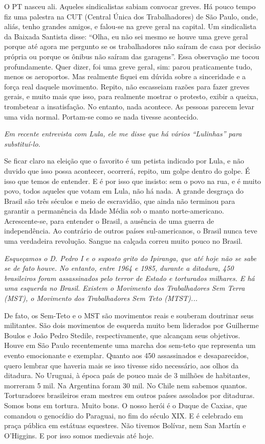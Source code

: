 \normalfont 
O PT nasceu ali. Aqueles sindicalistas sabiam convocar
greves. Há pouco tempo fiz uma palestra na CUT (Central Única dos
Trabalhadores) de São Paulo, onde, aliás, tenho grandes amigos, e
falou-se na greve geral na capital. Um sindicalista da Baixada Santista
disse: ``Olha, eu não sei mesmo se houve uma greve geral porque até
agora me pergunto se os trabalhadores não saíram de casa por decisão
própria ou porque os ônibus não saíram das garagens''. Essa observação
me tocou profundamente. Quer dizer, foi uma greve geral, sim: parou
praticamente tudo, menos os aeroportos. Mas realmente fiquei em dúvida
sobre a sinceridade e a força real daquele movimento. Repito, não
escasseiam razões para fazer greves gerais, e muito mais que isso, para
realmente mostrar o protesto, exibir a queixa, trombetear a
insatisfação. No entanto, nada acontece. As pessoas parecem levar uma
vida normal. Portam-se como se nada tivesse acontecido.

\itshape
Em recente entrevista com Lula, ele me disse que há
vários ``Lulinhas'' para substituí-lo.

\normalfont 
Se ficar claro na eleição que o favorito é um petista
indicado por Lula, e não duvido que isso possa acontecer, ocorrerá,
repito, um golpe dentro do golpe. É isso que temos de entender. E é por
isso que insisto: sem o povo na rua, e é muito povo, todos aqueles que
votam em Lula, não há nada. A grande desgraça do Brasil são três séculos
e meio de escravidão, que ainda não terminou para garantir a permanência
da Idade Média sob o manto norte-americano. Acrescente-se, para entender
o Brasil, a ausência de uma guerra de independência. Ao contrário de
outros países sul-americanos, o Brasil nunca teve uma verdadeira
revolução. Sangue na calçada correu muito pouco no Brasil.

\itshape
Esqueçamos o D. Pedro I e o suposto grito do Ipiranga,
que até hoje não se sabe se de fato houve. No entanto, entre 1964 e
1985, durante a ditadura, 450 brasileiros foram assassinados pelo terror
de Estado e torturados milhares. E há uma esquerda no Brasil. Existem o
Movimento dos Trabalhadores Sem Terra (MST), o Movimento dos
Trabalhadores Sem Teto (MTST)...

\normalfont 
De fato, os Sem-Teto e o MST são movimentos reais e
souberam doutrinar seus militantes. São dois movimentos de esquerda
muito bem liderados por Guilherme Boulos e João Pedro Stedile,
respectivamente, que alcançam seus objetivos. Houve em São Paulo
recentemente uma marcha dos sem-teto que representa um evento
emocionante e exemplar. Quanto aos 450 assassinados e desaparecidos,
quero lembrar que haveria mais se isso tivesse sido necessário, aos
olhos da ditadura. No Uruguai, à época país de pouco mais de 3 milhões
de habitantes, morreram 5 mil. Na Argentina foram 30 mil. No Chile nem
sabemos quantos. Torturadores brasileiros eram mestres em outros países
assolados por ditaduras. Somos bons em tortura. Muito bons. O nosso
herói é o Duque de Caxias, que comandou o genocídio do Paraguai, no fim
do século XIX. E é celebrado em praça pública em estátuas equestres. Não
tivemos Bolívar, nem San Martín e O'Higgins. E por isso somos medievais
até hoje.

